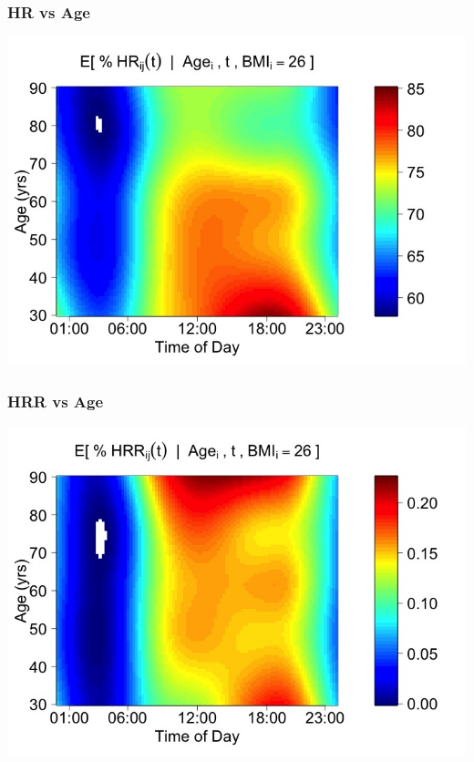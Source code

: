 \documentclass[10pt]{beamer}\usepackage[]{graphicx}\usepackage[]{color}
\begin{document}
\begin{frame}
\frametitle{HR vs Age}
\begin{center}
\includegraphics[height=\textheight]{coef_HR_mar.jpeg}
\end{center}
\end{frame}

\begin{frame}
\frametitle{HRR vs Age}
\begin{center}
\includegraphics[height=\textheight]{coef_HRR_mar.jpeg}
\end{center}
\end{frame}
\end{document}

